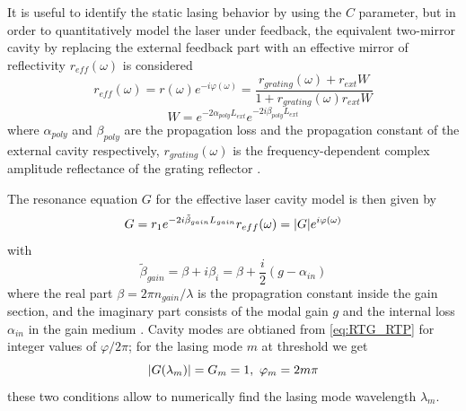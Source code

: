 It is useful to identify the static lasing behavior by using the $C$ parameter, but in order to quantitatively model the laser under feedback, the equivalent two-mirror cavity by replacing the external feedback part with an effective mirror of reflectivity $r_{eff}(\omega)$ is considered
\begin{equation}
    r_{eff}(\omega)=r(\omega)e^{-i\varphi(\omega)}=\frac{r_{grating}(\omega)+r_{ext}W}{1+r_{grating}(\omega)r_{ext}W}
    \label{eq:effective_reflectivity}
\end{equation}
\begin{equation}
    W=e^{-2\alpha_{poly}L_{ext}}e^{-2i\beta_{poly}L_{ext}}
\end{equation}
where $\alpha_{poly}$ and $\beta_{poly}$ are the propagation loss and the propagation constant of the external cavity respectively, $r_{grating}(\omega)$ is the frequency-dependent complex amplitude reflectance of the grating reflector \cite{yariv1977periodic}.

The resonance equation $G$ for the effective laser cavity model is then given by \cite{vallone2011enhanced}
\begin{equation}
    G=r_1e^{-2i\tilde{\beta}_{gain}L_{gain}}r_{eff}(\omega)=\abs{G}e^{i\varphi(\omega)}
    \label{eq:RTG_RTP}
\end{equation}
with
\begin{equation}
    \tilde{\beta}_{gain}=\beta+i\beta_{i}=\beta+\frac{i}{2}(g-\alpha_{in})
    \label{eq:beta_gain}
\end{equation}
where the real part $\beta=2\pi n_{gain}/\lambda$ is the propagration constant inside the gain section, and the imaginary part consists of the modal gain $g$ and the internal loss $\alpha_{in}$ in the gain medium \cite{coldren2012diode}. Cavity modes are obtianed from \autoref{eq:RTG_RTP} for integer values of $\varphi/2\pi$; for the lasing mode $m$ at threshold we get
\begin{equation}
    \abs{G(\lambda_m)}=G_m=1,\ \varphi_m=2m\pi
    \label{eq:lasing_condition}
\end{equation}
these two conditions allow to numerically find the lasing mode wavelength $\lambda_m$.

